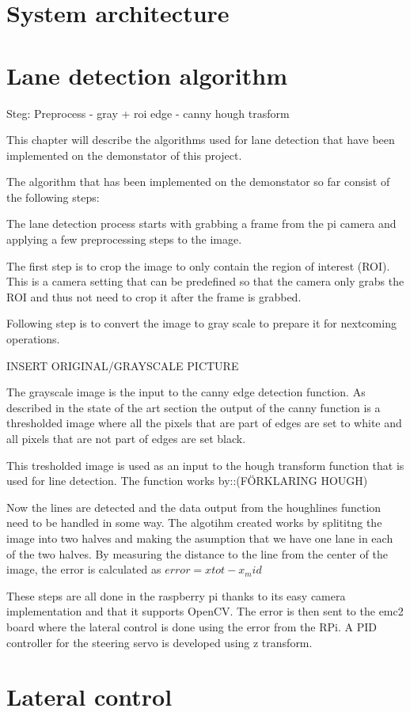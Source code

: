 \section{System architecture}


\section{Lane detection algorithm}


Steg: Preprocess - gray + roi
edge - canny
hough trasform


This chapter will describe the algorithms used for lane detection that have been implemented on the demonstator of this project. 

The algorithm that has been implemented on the demonstator so far consist of the following steps:

The lane detection process starts with grabbing a frame from the pi camera and applying a few preprocessing steps to the image. 

The first step is to crop the image to only contain the region of interest (ROI). This is a camera setting that can be predefined so that the camera only grabs the ROI and thus not need to crop it after the frame is grabbed.


Following step is to convert the image to gray scale to prepare it for nextcoming operations. 



INSERT ORIGINAL/GRAYSCALE PICTURE


The grayscale image is the input to the canny edge detection function. As described in the state of the art section the output of the canny function is a thresholded image where all the pixels that are part of edges are set to white and all pixels that are not part of edges are set black.

This tresholded image is used as an input to the hough transform function that is used for line detection. The function works by::(FÖRKLARING HOUGH)

Now the lines are detected and the data  output from the houghlines function need to be handled in some way. 
The algotihm created works by splititng the image into two halves and making the asumption that we have one lane in each of the two halves. By measuring the distance to the line from the center of the image, the error is calculated as $error = xtot - x_mid$


These steps are all done in the raspberry pi thanks to its easy camera implementation and that it supports OpenCV. The error is then sent to the emc2 board where the lateral control is done using the error from the RPi. A PID controller for the steering servo is developed using z transform.




\section{Lateral control}

